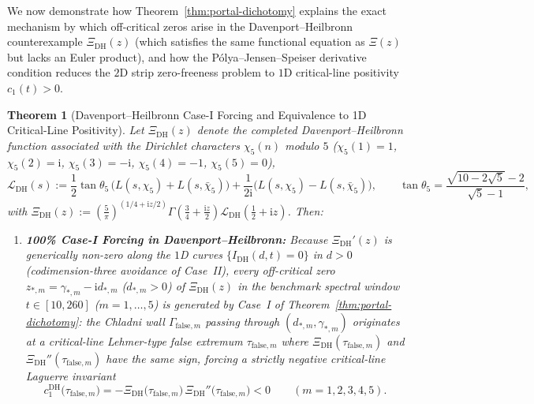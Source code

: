 \documentclass[11pt,reqno]{amsart}
\newtheorem{theorem}{Theorem}[section]
\theoremstyle{definition}
\theoremstyle{remark}
\numberwithin{equation}{section}
\newcommand{\ii}{\mathrm{i}}
\newcommand{\DHf}{\mathrm{DH}}
\begin{document}
We now demonstrate how Theorem~\ref{thm:portal-dichotomy} explains the exact mechanism by which off-critical zeros arise in the Davenport--Heilbronn counterexample $\Xi_{\DHf}(z)$ \cite{DavenportHeilbronn1936,Titchmarsh1986} (which satisfies the same functional equation as $\Xi(z)$ but lacks an Euler product), and how the P\'{o}lya--Jensen--Speiser derivative condition reduces the $2$D strip zero-freeness problem to $1$D critical-line positivity $c_1(t)>0$.

\begin{theorem}[Davenport--Heilbronn Case-I Forcing and Equivalence to 1D Critical-Line Positivity]\label{thm:dh-case1-equivalence}
Let $\Xi_{\DHf}(z)$ denote the completed Davenport--Heilbronn function associated with the Dirichlet characters $\chi_5(n)$ modulo $5$ ($\chi_5(1)=1$, $\chi_5(2)=\ii$, $\chi_5(3)=-\ii$, $\chi_5(4)=-1$, $\chi_5(5)=0$),
\begin{equation}\label{eq:Xi-DH-def}
\mathcal{L}_{\DHf}(s) := \frac{1}{2}\tan\theta_5\,\bigl(L(s,\chi_5) + L(s,\bar{\chi}_5)\bigr) + \frac{1}{2\ii}\bigl(L(s,\chi_5) - L(s,\bar{\chi}_5)\bigr), \qquad \tan\theta_5 = \frac{\sqrt{10 - 2\sqrt{5}} - 2}{\sqrt{5} - 1},
\end{equation}
with $\Xi_{\DHf}(z) := (\frac{5}{\pi})^{(1/4+\ii z/2)}\Gamma(\frac{3}{4}+\frac{\ii z}{2})\mathcal{L}_{\DHf}(\frac{1}{2}+\ii z)$. Then:
\begin{enumerate}[label=\upshape(\alph*),leftmargin=2.2em]
\item \textbf{100\% Case-I Forcing in Davenport--Heilbronn:} Because $\Xi_{\DHf}'(z)$ is generically non-zero along the $1$D curves $\{I_{\DHf}(d,t)=0\}$ in $d>0$ (codimension-three avoidance of Case~II), every off-critical zero $z_{*,m} = \gamma_{*,m} - \ii d_{*,m}$ ($d_{*,m}>0$) of $\Xi_{\DHf}(z)$ in the benchmark spectral window $t \in [10,260]$ ($m=1,\dots,5$) is generated by \emph{Case~I} of Theorem~\ref{thm:portal-dichotomy}: the Chladni wall $\Gamma_{\mathrm{false},m}$ passing through $(d_{*,m},\gamma_{*,m})$ originates at a critical-line Lehmer-type false extremum $\tau_{\mathrm{false},m}$ where $\Xi_{\DHf}(\tau_{\mathrm{false},m})$ and $\Xi_{\DHf}''(\tau_{\mathrm{false},m})$ have the \emph{same sign}, forcing a strictly negative critical-line Laguerre invariant
\begin{equation}\label{eq:DH-c1-neg}
c_1^{\DHf}\bigl(\tau_{\mathrm{false},m}\bigr) = -\Xi_{\DHf}\bigl(\tau_{\mathrm{false},m}\bigr)\,\Xi_{\DHf}''\bigl(\tau_{\mathrm{false},m}\bigr) < 0 \qquad (m = 1,2,3,4,5).
\end{equation}

\end{enumerate}
\end{theorem}
\end{document}
